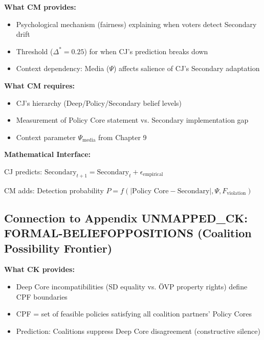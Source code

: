 \begin{tcolorbox}[colback=yellow!5!white, colframe=yellow!75!black,
    title=Integration: Appendix UNMAPPED_CM $\leftrightarrow$ Appendix UNMAPPED_CJ (Sabatier)]

\textbf{What CM provides:}
\begin{itemize}[nosep]
\item Psychological mechanism (fairness) explaining when voters detect Secondary drift
\item Threshold ($\Delta^* = 0.25$) for when CJ's prediction breaks down
\item Context dependency: Media ($\Psi$) affects salience of CJ's Secondary adaptation
\end{itemize}

\textbf{What CM requires:}
\begin{itemize}[nosep]
\item CJ's hierarchy (Deep/Policy/Secondary belief levels)
\item Measurement of Policy Core statement vs. Secondary implementation gap
\item Context parameter $\Psi_{\text{media}}$ from Chapter 9
\end{itemize}

\textbf{Mathematical Interface:}

CJ predicts: $\text{Secondary}_{t+1} = \text{Secondary}_t + \epsilon_{\text{empirical}}$

CM adds: Detection probability $P = f(|\text{Policy Core} - \text{Secondary}|, \Psi, F_{\text{violation}})$

\end{tcolorbox}

\subsection{Connection to Appendix UNMAPPED_CK: FORMAL-BELIEFOPPOSITIONS (Coalition Possibility Frontier)}

\textbf{What CK provides:}
\begin{itemize}[nosep]
\item Deep Core incompatibilities (SD equality vs. ÖVP property rights) define CPF boundaries
\item CPF = set of feasible policies satisfying all coalition partners' Policy Cores
\item Prediction: Coalitions suppress Deep Core disagreement (constructive silence)
\end{itemize}

